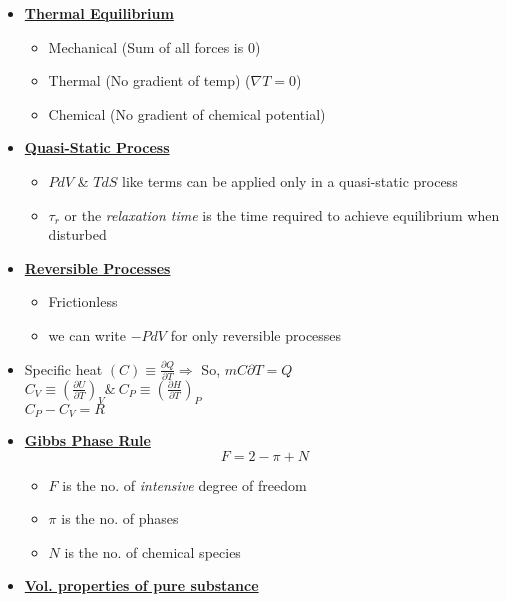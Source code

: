 \documentclass[12pt]{article}
\begin{document}
\begin{itemize}
\begin{tikzpicture}[x=0.75pt,y=0.75pt,yscale=-1,xscale=1]
\end{tikzpicture}
			\item \textbf{\underline{Thermal Equilibrium}}
			\begin{itemize}
			\item Mechanical (Sum of all forces is 0)
			\item Thermal (No gradient of temp) ($\nabla T =0$)
			\item Chemical (No gradient of chemical potential)
			\end{itemize}
			\item \textbf{\underline{ Quasi-Static Process}}
			\begin{itemize}
				\item $PdV$ \& $TdS$ like terms can be applied only in a quasi-static process
				\item $\tau_r$ or the \textit{relaxation time} is the time required to achieve equilibrium when disturbed
			\end{itemize}
			\item \textbf{\underline{Reversible Processes}}
			\begin{itemize}
				\item Frictionless
				\item we can write $-PdV$ for only reversible processes
			\end{itemize}
			\item Specific heat $(C) \equiv \frac{\partial Q}{\partial T} \Rightarrow$ So, $mC\partial T = Q$\\
			$\displaystyle C_V \equiv \left( \frac{\partial U}{\partial T}\right)_V \&\ C_P \equiv \left( \frac{\partial H}{\partial T}\right)_P$\\
			$C_P - C_V = R$
			\item \textbf{\underline{ Gibbs Phase Rule}}
			\[ F = 2- \pi +N\]
			\begin{itemize}
				\item $F$ is the no. of \textit{intensive} degree of freedom
				\item $\pi$ is the no. of phases
				\item $N$ is the no. of chemical species
			\end{itemize}
			\item \textbf{\underline{Vol. properties of pure substance}}\\
			


\begin{tikzpicture}[x=0.75pt,y=0.75pt,yscale=-1,xscale=1]


\end{tikzpicture}
\end{itemize}
\end{document}
